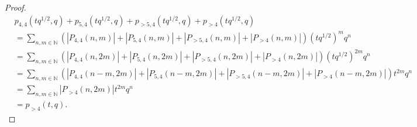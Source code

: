 \documentclass[12pt, a4paper]{article}
\theoremstyle{remark}
\begin{document}
\begin{proof}
\begin{align*}
    &p_{4, 4}(tq^{1/2}, q) + p_{5, 4}(tq^{1/2}, q) + p_{>5, 4}(tq^{1/2}, q) + p_{>4}(tq^{1/2}, q) \\
    &= \sum_{n, m\in \mathbb{N}}(|P_{4, 4}(n, m)| + |P_{5, 4}(n, m)| + |P_{>5, 4}(n, m)| + |P_{>4}(n, m)|)(tq^{1/2})^mq^n \\
    &= \sum_{n, m\in \mathbb{N}}(|P_{4, 4}(n, 2m)| + |P_{5, 4}(n, 2m)| + |P_{>5, 4}(n, 2m)| + |P_{>4}(n, 2m)|)(tq^{1/2})^{2m}q^n \\
    &= \sum_{n, m\in \mathbb{N}}(|P_{4, 4}(n - m, 2m)| + |P_{5, 4}(n - m, 2m)| + |P_{>5, 4}(n - m, 2m)| + |P_{>4}(n - m, 2m)|)t^{2m}q^n \\
    &= \sum_{n, m\in \mathbb{N}}|P_{>4}(n, 2m)|t^{2m}q^n \\
    &= p_{>4}(t, q).
  \end{align*}
  

\end{proof}
\end{document}
